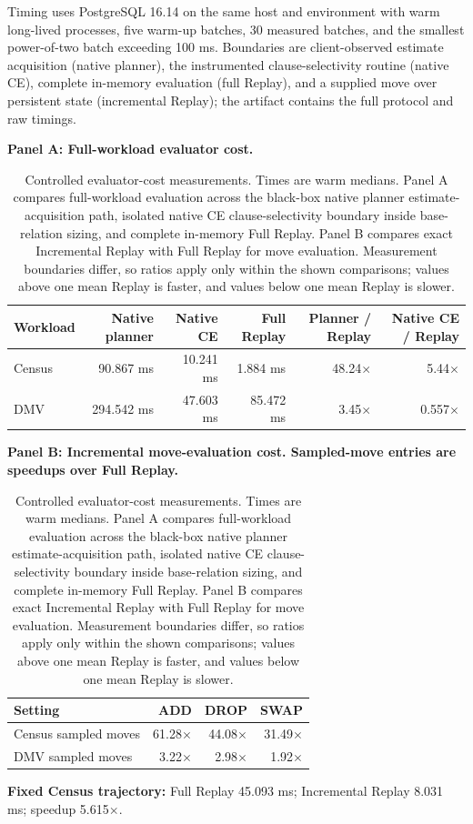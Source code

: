 \documentclass[sigconf,nonacm]{acmart}
\begin{document}
Timing uses PostgreSQL 16.14 on the same host and environment with warm long-lived processes, five warm-up batches, 30 measured batches, and the smallest power-of-two batch exceeding 100 ms. Boundaries are client-observed estimate acquisition (native planner), the instrumented clause-selectivity routine (native CE), complete in-memory evaluation (full Replay), and a supplied move over persistent state (incremental Replay); the artifact contains the full protocol and raw timings.

\begin{table}[t]
\centering
\small
\caption{Controlled evaluator-cost measurements. Times are warm medians. Panel A compares full-workload evaluation across the black-box native planner estimate-acquisition path, isolated native CE clause-selectivity boundary inside base-relation sizing, and complete in-memory Full Replay. Panel B compares exact Incremental Replay with Full Replay for move evaluation. Measurement boundaries differ, so ratios apply only within the shown comparisons; values above one mean Replay is faster, and values below one mean Replay is slower.}
\label{tab:t4}
\textbf{Panel A: Full-workload evaluator cost.}\par\smallskip
\begin{tabularx}{\textwidth}{@{}>{\raggedright\arraybackslash}Xrrrrr@{}}
\toprule
Workload & Native planner & Native CE & Full Replay & Planner / Replay & Native CE / Replay \\
\midrule
Census & 90.867 ms & 10.241 ms & 1.884 ms & 48.24$\times$ & 5.44$\times$ \\
DMV & 294.542 ms & 47.603 ms & 85.472 ms & 3.45$\times$ & 0.557$\times$ \\
\bottomrule
\end{tabularx}
\medskip
\textbf{Panel B: Incremental move-evaluation cost. Sampled-move entries are speedups over Full Replay.}\par\smallskip
\begin{tabularx}{\textwidth}{@{}>{\raggedright\arraybackslash}Xrrr@{}}
\toprule
Setting & ADD & DROP & SWAP \\
\midrule
Census sampled moves & 61.28$\times$ & 44.08$\times$ & 31.49$\times$ \\
DMV sampled moves & 3.22$\times$ & 2.98$\times$ & 1.92$\times$ \\
\bottomrule
\end{tabularx}
\smallskip
\textbf{Fixed Census trajectory:} Full Replay 45.093 ms; Incremental Replay 8.031 ms; speedup 5.615$\times$.
\end{table}
\end{document}

